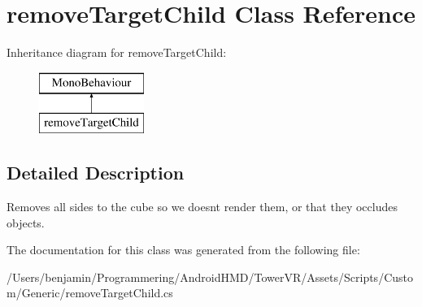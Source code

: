 \hypertarget{classremove_target_child}{}\section{remove\+Target\+Child Class Reference}
\label{classremove_target_child}
Inheritance diagram for remove\+Target\+Child\+:\begin{figure}[H]
\begin{center}
\leavevmode
\includegraphics[height=2.000000cm]{classremove_target_child}
\end{center}
\end{figure}


\subsection{Detailed Description}
Removes all sides to the cube so we doesn\textquotesingle{}t render them, or that they occludes objects. 

The documentation for this class was generated from the following file\+:\begin{DoxyCompactItemize}
\item 
/\+Users/benjamin/\+Programmering/\+Android\+H\+M\+D/\+Tower\+V\+R/\+Assets/\+Scripts/\+Custom/\+Generic/remove\+Target\+Child.\+cs\end{DoxyCompactItemize}
